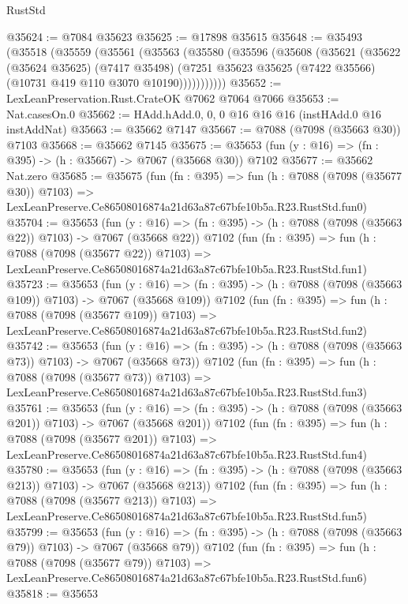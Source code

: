 \begin{lexlean}{RustStd}
\begin{coremodule}
@35624 := @7084 @35623
@35625 := @17898 @35615
@35648 := @35493
    (@35518
      (@35559
        (@35561
          (@35563
            (@35580
              (@35596
                (@35608
                  (@35621
                    (@35622
                      (@35624 @35625)
                      (@7417 @35498)
                      (@7251 @35623 @35625 (@7422 @35566) (@10731 @419 @110 @3070 @10190)))))))))))
@35652 := LexLeanPreservation.Rust.CrateOK @7062 @7064 @7066
@35653 := Nat.casesOn.{0}
@35662 := HAdd.hAdd.{0, 0, 0} @16 @16 @16 (instHAdd.{0} @16 instAddNat)
@35663 := @35662 @7147
@35667 := @7088 (@7098 (@35663 @30)) @7103
@35668 := @35662 @7145
@35675 := @35653 (fun (y : @16) => (fn : @395) -> (h : @35667) -> @7067 (@35668 @30)) @7102
@35677 := @35662 Nat.zero
@35685 := @35675
    (fun (fn : @395) =>
    fun (h : @7088 (@7098 (@35677 @30)) @7103) =>
    LexLeanPreserve.Ce86508016874a21d63a87c67bfe10b5a.R23.RustStd.fun0)
@35704 := @35653
    (fun (y : @16) => (fn : @395) -> (h : @7088 (@7098 (@35663 @22)) @7103) -> @7067 (@35668 @22))
    @7102
    (fun (fn : @395) =>
    fun (h : @7088 (@7098 (@35677 @22)) @7103) =>
    LexLeanPreserve.Ce86508016874a21d63a87c67bfe10b5a.R23.RustStd.fun1)
@35723 := @35653
    (fun (y : @16) => (fn : @395) -> (h : @7088 (@7098 (@35663 @109)) @7103) -> @7067 (@35668 @109))
    @7102
    (fun (fn : @395) =>
    fun (h : @7088 (@7098 (@35677 @109)) @7103) =>
    LexLeanPreserve.Ce86508016874a21d63a87c67bfe10b5a.R23.RustStd.fun2)
@35742 := @35653
    (fun (y : @16) => (fn : @395) -> (h : @7088 (@7098 (@35663 @73)) @7103) -> @7067 (@35668 @73))
    @7102
    (fun (fn : @395) =>
    fun (h : @7088 (@7098 (@35677 @73)) @7103) =>
    LexLeanPreserve.Ce86508016874a21d63a87c67bfe10b5a.R23.RustStd.fun3)
@35761 := @35653
    (fun (y : @16) => (fn : @395) -> (h : @7088 (@7098 (@35663 @201)) @7103) -> @7067 (@35668 @201))
    @7102
    (fun (fn : @395) =>
    fun (h : @7088 (@7098 (@35677 @201)) @7103) =>
    LexLeanPreserve.Ce86508016874a21d63a87c67bfe10b5a.R23.RustStd.fun4)
@35780 := @35653
    (fun (y : @16) => (fn : @395) -> (h : @7088 (@7098 (@35663 @213)) @7103) -> @7067 (@35668 @213))
    @7102
    (fun (fn : @395) =>
    fun (h : @7088 (@7098 (@35677 @213)) @7103) =>
    LexLeanPreserve.Ce86508016874a21d63a87c67bfe10b5a.R23.RustStd.fun5)
@35799 := @35653
    (fun (y : @16) => (fn : @395) -> (h : @7088 (@7098 (@35663 @79)) @7103) -> @7067 (@35668 @79))
    @7102
    (fun (fn : @395) =>
    fun (h : @7088 (@7098 (@35677 @79)) @7103) =>
    LexLeanPreserve.Ce86508016874a21d63a87c67bfe10b5a.R23.RustStd.fun6)
@35818 := @35653

\end{coremodule}
\end{lexlean}
